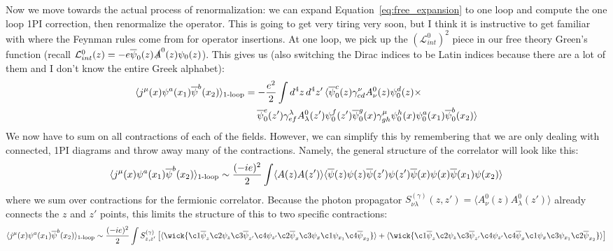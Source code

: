 \documentclass[11pt, oneside]{article}   	%
\theoremstyle{definition}
\begin{document}
Now we move towards the actual process of renormalization: we can expand Equation~\ref{eq:free_expansion} to 
one loop and compute the one loop 1PI correction, then renormalize the operator. This is going to get very tiring very soon, 
but I think it is instructive to get familiar with where the Feynman rules come from for operator insertions. At one 
loop, we pick up the $(\mathcal L_{int}^0)^2$ piece in our free theory Green's function (recall $\mathcal L_{int}^0(z) = 
-e\overline\psi_0(z) \slashed A^0(z) \psi_0(z)$). This gives us (also switching the Dirac indices to be Latin indices because 
there are a lot of them and I don't know the entire Greek alphabet):
\begin{align}
	\langle j^\mu(x) \psi^a(x_1)\overline \psi^b(x_2)\rangle_\textnormal{1-loop} = -\frac{e^2}{2}\int d^4z\, d^4z'\,\langle 
	\overline\psi_0^c(z) 
	&\gamma^\nu_{cd} A_\nu^0(z) \psi_0^d(z)
	\times\nonumber \\
	\overline\psi_0^e(z')\gamma^\lambda_{ef} A_\lambda^0(z')\psi_0^f(z')
	&\overline\psi_0^g(x) \gamma_{gh}^\mu \psi_0^h(x) \psi_0^a (x_1) \overline \psi_0^b(x_2)\rangle 
\end{align}
We now have to sum on all contractions of each of the fields. However, we can simplify this by remembering that we are only 
dealing with connected, 1PI diagrams and throw away many of the contractions. Namely, the general structure of the correlator 
will look like this:
\begin{equation}
	\langle j^\mu(x) \psi^a(x_1)\overline \psi^b(x_2)\rangle_\textnormal{1-loop}\sim \frac{(-ie)^2}{2}\int \langle A(z) A(z')\rangle 
	\langle \overline\psi(z) \psi(z) \overline\psi(z') \psi(z') \overline\psi(x)\psi(x) \overline\psi(x_1)\psi(x_2)\rangle
	\nonumber
\end{equation}
where we sum over contractions for the fermionic correlator. Because the photon propagator $S^{(\gamma)}_{\nu\lambda}(z, 
z') = \langle A_\nu^0(z) A_\lambda^0(z')\rangle$ already connects the $z$ and $z'$ points, this limits the structure of this to 
two specific contractions:
\begin{equation}
	\langle j^\mu(x) \psi^a(x_1)\overline \psi^b(x_2)\rangle_\textnormal{1-loop} \sim\frac{(-ie)^2}{2}\int S^{(\gamma)}_{z, z'}
	\left[
	\langle \wick{
	\c1{\overline \psi_z} \c2{\psi_z} \c3{\overline\psi_{z'}}  \c4{\psi_{z'}} \c2{\overline\psi_x} \c3{\psi_x} \c1{\psi_{x_1}}
	\c4{\overline\psi_{x_2} }
	}\rangle + \langle \wick{
	\c1{\overline \psi_z} \c2{\psi_z} \c3{\overline\psi_{z'}}  \c4{\psi_{z'}} \c4{\overline\psi_x} \c1{\psi_x} \c3{\psi_{x_1}} 
	\c2{\overline\psi_{x_2}}
	} \rangle \right]
	\nonumber
\end{equation}
\end{document}

